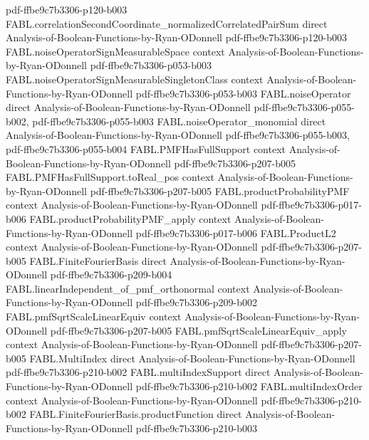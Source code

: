 \begin{theorem}
  {pdf-ffbe9c7b3306-p120-b003}
\proofstep
  {FABL.correlationSecondCoordinate_normalizedCorrelatedPairSum}
  {direct}
  {Analysis-of-Boolean-Functions-by-Ryan-ODonnell}
  {pdf-ffbe9c7b3306-p120-b003}
\proofstep
  {FABL.noiseOperatorSignMeasurableSpace}
  {context}
  {Analysis-of-Boolean-Functions-by-Ryan-ODonnell}
  {pdf-ffbe9c7b3306-p053-b003}
\proofstep
  {FABL.noiseOperatorSignMeasurableSingletonClass}
  {context}
  {Analysis-of-Boolean-Functions-by-Ryan-ODonnell}
  {pdf-ffbe9c7b3306-p053-b003}
\proofstep
  {FABL.noiseOperator}
  {direct}
  {Analysis-of-Boolean-Functions-by-Ryan-ODonnell}
  {pdf-ffbe9c7b3306-p055-b002,
    pdf-ffbe9c7b3306-p055-b003}
\proofstep
  {FABL.noiseOperator_monomial}
  {direct}
  {Analysis-of-Boolean-Functions-by-Ryan-ODonnell}
  {pdf-ffbe9c7b3306-p055-b003,
    pdf-ffbe9c7b3306-p055-b004}
\proofstep
  {FABL.PMFHasFullSupport}
  {context}
  {Analysis-of-Boolean-Functions-by-Ryan-ODonnell}
  {pdf-ffbe9c7b3306-p207-b005}
\proofstep
  {FABL.PMFHasFullSupport.toReal_pos}
  {context}
  {Analysis-of-Boolean-Functions-by-Ryan-ODonnell}
  {pdf-ffbe9c7b3306-p207-b005}
\proofstep
  {FABL.productProbabilityPMF}
  {context}
  {Analysis-of-Boolean-Functions-by-Ryan-ODonnell}
  {pdf-ffbe9c7b3306-p017-b006}
\proofstep
  {FABL.productProbabilityPMF_apply}
  {context}
  {Analysis-of-Boolean-Functions-by-Ryan-ODonnell}
  {pdf-ffbe9c7b3306-p017-b006}
\proofstep
  {FABL.ProductL2}
  {context}
  {Analysis-of-Boolean-Functions-by-Ryan-ODonnell}
  {pdf-ffbe9c7b3306-p207-b005}
\proofstep
  {FABL.FiniteFourierBasis}
  {direct}
  {Analysis-of-Boolean-Functions-by-Ryan-ODonnell}
  {pdf-ffbe9c7b3306-p209-b004}
\proofstep
  {FABL.linearIndependent_of_pmf_orthonormal}
  {context}
  {Analysis-of-Boolean-Functions-by-Ryan-ODonnell}
  {pdf-ffbe9c7b3306-p209-b002}
\proofstep
  {FABL.pmfSqrtScaleLinearEquiv}
  {context}
  {Analysis-of-Boolean-Functions-by-Ryan-ODonnell}
  {pdf-ffbe9c7b3306-p207-b005}
\proofstep
  {FABL.pmfSqrtScaleLinearEquiv_apply}
  {context}
  {Analysis-of-Boolean-Functions-by-Ryan-ODonnell}
  {pdf-ffbe9c7b3306-p207-b005}
\proofstep
  {FABL.MultiIndex}
  {direct}
  {Analysis-of-Boolean-Functions-by-Ryan-ODonnell}
  {pdf-ffbe9c7b3306-p210-b002}
\proofstep
  {FABL.multiIndexSupport}
  {direct}
  {Analysis-of-Boolean-Functions-by-Ryan-ODonnell}
  {pdf-ffbe9c7b3306-p210-b002}
\proofstep
  {FABL.multiIndexOrder}
  {context}
  {Analysis-of-Boolean-Functions-by-Ryan-ODonnell}
  {pdf-ffbe9c7b3306-p210-b002}
\proofstep
  {FABL.FiniteFourierBasis.productFunction}
  {direct}
  {Analysis-of-Boolean-Functions-by-Ryan-ODonnell}
  {pdf-ffbe9c7b3306-p210-b003}

\end{theorem}
